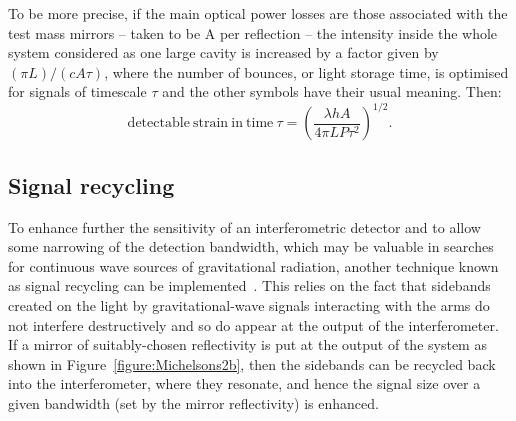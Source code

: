 
To be more precise, if the main optical power losses are those associated with
the test mass mirrors -- taken to be A per reflection -- the intensity inside
the whole system considered as one large cavity is increased by a factor given
by $(\pi L)/(c A \tau)$, where the number of bounces, or light storage time, is
optimised for signals of timescale $\tau$ and the other symbols have their usual
meaning. Then:
\begin{equation}
  \mathrm{detectable\ strain\ in\ time\ } \tau = \left( \frac{\lambda h
  A}{4 \pi L P \tau^2} \right)^{1/2}.
  \label{equation:shotpower}
\end{equation}


\subsection{Signal recycling}
\label{subsection:sigrec} 

To enhance further the sensitivity of an interferometric detector and to allow
some narrowing of the detection bandwidth, which may be valuable in searches for
continuous wave sources of gravitational radiation, another technique known as
signal recycling can be implemented~\cite{Meers, Strain, Heinzel}. This relies
on the fact that sidebands created on the light by gravitational-wave signals
interacting with the arms do not interfere destructively and so do appear at the
output of the interferometer. If a mirror of suitably-chosen reflectivity is put
at the output of the system as shown in Figure~\ref{figure:Michelsons2b}, then the
sidebands can be recycled back into the interferometer, where they resonate, and
hence the signal size over a given bandwidth (set by the mirror reflectivity) is
enhanced.

